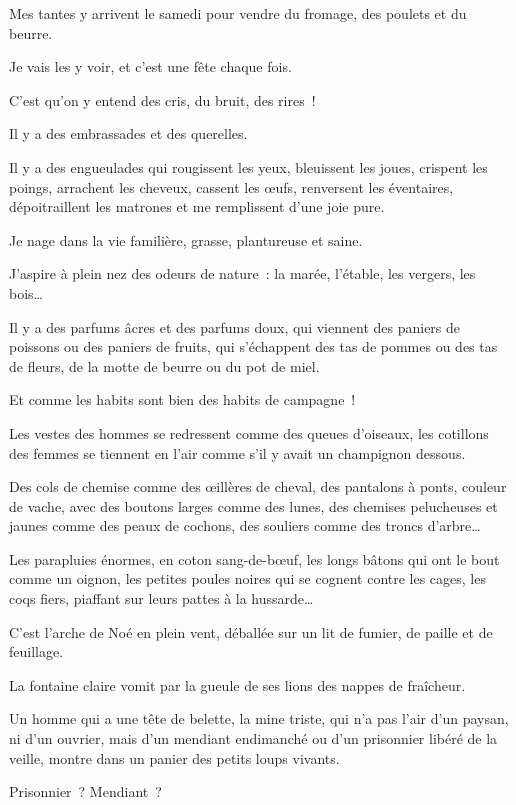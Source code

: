 \documentclass[french,twoside]{book} %
\def\mednobreak{\ifdim\lastskip<\medskipamount
  \removelastskip\nopagebreak\medskip\fi}
\newcommand{\labelblock}[1]{\medbreak{\noindent\color{rubric}\bfseries #1}\par\mednobreak}
\begin{document}
\labelblock{LE PLOT}

\noindent Mes tantes y arrivent le samedi pour vendre du fromage, des poulets et du beurre.\par
Je vais les y voir, et c’est une fête chaque fois.\par
C’est qu’on y entend des cris, du bruit, des rires !\par
Il y a des embrassades et des querelles.\par
Il y a des engueulades qui rougissent les yeux, bleuissent les joues, crispent les poings, arrachent les cheveux, cassent les œufs, renversent les éventaires, dépoitraillent les matrones et me remplissent d’une joie pure.\par
Je nage dans la vie familière, grasse, plantureuse et saine.\par
J’aspire à plein nez des odeurs de nature : la marée, l’étable, les vergers, les bois…\par
Il y a des parfums âcres et des parfums doux, qui viennent des paniers de poissons ou des paniers de fruits, qui s’échappent des tas de pommes ou des tas de fleurs, de la motte de beurre ou du pot de miel.\par
Et comme les habits sont bien des habits de campagne !\par
Les vestes des hommes se redressent comme des queues d’oiseaux, les cotillons des femmes se tiennent en l’air comme s’il y avait un champignon dessous.\par
Des cols de chemise comme des œillères de cheval, des pantalons à ponts, couleur de vache, avec des boutons larges comme des lunes, des chemises pelucheuses et jaunes comme des peaux de cochons, des souliers comme des troncs d’arbre…\par
Les parapluies énormes, en coton sang-de-bœuf, les longs bâtons qui ont le bout comme un oignon, les petites poules noires qui se cognent contre les cages, les coqs fiers, piaffant sur leurs pattes à la hussarde…\par
C’est l’arche de Noé en plein vent, déballée sur un lit de fumier, de paille et de feuillage.\par
La fontaine claire vomit par la gueule de ses lions des nappes de fraîcheur.\par
\bigbreak
\noindent Un homme qui a une tête de belette, la mine triste, qui n’a pas l’air d’un paysan, ni d’un ouvrier, mais d’un mendiant endimanché ou d’un prisonnier libéré de la veille, montre dans un panier des petits loups vivants.\par
Prisonnier ? Mendiant ?\par
\end{document}
